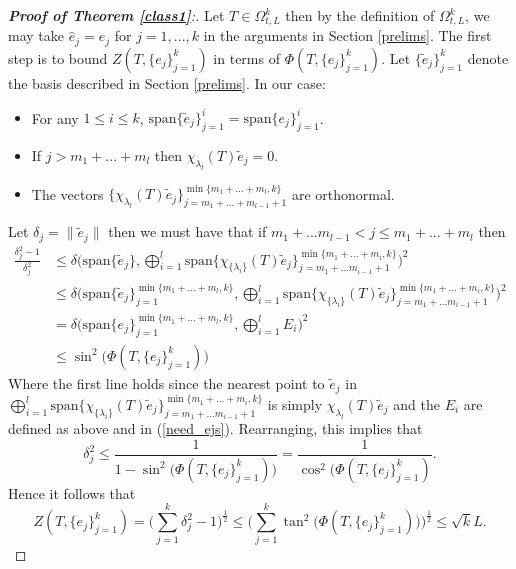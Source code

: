 \documentclass[a4paper,10pt]{article}
\begin{document}
\begin{proof}[\textbf{Proof of Theorem \ref{class1}}:]
Let $T\in\Omega_{t,L}^k$ then by the definition of $\Omega_{t,L}^k$, we may take $\hat e_j=e_j$ for $j=1,...,k$ in the arguments in Section \ref{prelims}. The first step is to bound $Z(T,\{e_j\}_{j=1}^{k})$ in terms of $\Phi(T,\{e_j\}_{j=1}^k)$. Let $\{\tilde e_j\}_{j=1}^k$ denote the basis described in Section \ref{prelims}. In our case:
\begin{itemize}
	\item For any $1\leq i\leq k$, $\mathrm{span}\{\tilde e_j\}_{j=1}^i=\mathrm{span}\{e_j\}_{j=1}^i$.
	\item If $j>m_1+...+m_l$ then $\chi_{\lambda_l}(T)\tilde e_j=0$.
	\item The vectors $\{\chi_{\lambda_l}(T)\tilde e_j\}_{j=m_1+...+m_{l-1}+1}^{\min\{m_1+...+m_{l},k\}}$ are orthonormal.
\end{itemize}
Let $\delta_j=\|\tilde e_j\|$ then we must have that if $m_1+...m_{l-1}<j\leq m_1+...+m_l$ then
\begin{align*}
\frac{\delta_j^2-1}{\delta_j^2}&\leq \delta\Big(\mathrm{span}\{\tilde e_j\},\bigoplus_{i=1}^l\mathrm{span}\{\chi_{\{\lambda_i\}}(T)\tilde e_j\}_{j=m_1+...m_{i-1}+1}^{\min\{m_1+...+m_{i},k\}}\Big)^2\\%
&\leq \delta\Big(\mathrm{span}\{\tilde e_j\}_{j=1}^{\min\{m_1+...+m_{l},k\}},\bigoplus_{i=1}^l\mathrm{span}\{\chi_{\{\lambda_i\}}(T)\tilde e_j\}_{j=m_1+...m_{i-1}+1}^{\min\{m_1+...+m_{i},k\}}\Big)^2\\
&=\delta\Big(\mathrm{span}\{e_j\}_{j=1}^{\min\{m_1+...+m_{l},k\}},\bigoplus_{i=1}^l E_i\Big)^2\\
&\leq \sin^2\big(\Phi(T,\{e_j\}_{j=1}^k)\big)
\end{align*}
Where the first line holds since the nearest point to $\tilde e_j$ in $\bigoplus_{i=1}^l\mathrm{span}\{\chi_{\{\lambda_i\}}(T)\tilde e_j\}_{j=m_1+...m_{i-1}+1}^{\min\{m_1+...+m_{i},k\}}$ is simply $\chi_{\lambda_l}(T)\tilde e_j$ and the $E_i$ are defined as above and in (\ref{need_ejs}). Rearranging, this implies that
$$
\delta_j^2\leq \frac{1}{1-\sin^2\big(\Phi(T,\{e_j\}_{j=1}^k)\big)}=\frac{1}{\cos^2\big(\Phi(T,\{e_j\}_{j=1}^k)}.
$$
Hence it follows that
$$
Z(T,\{e_j\}_{j=1}^{k})=\Big(\sum_{j=1}^k \delta_j^2-1\Big)^{\frac{1}{2}}\leq \Big(\sum_{j=1}^k \tan^2\big(\Phi(T,\{e_j\}_{j=1}^k)\big)\Big)^{\frac{1}{2}}\leq \sqrt{k}L.
$$


\end{proof}
\end{document}
